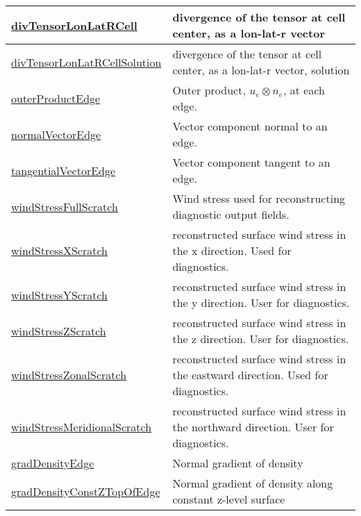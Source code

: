 {\begin{center}
\begin{longtable}{| p{2.0in} | p{4.0in} |}
    \hline
    \hyperref[subsec:var_sec_scratch_divTensorLonLatRCell]{divTensorLonLatRCell} & divergence of the tensor at cell center, as a lon-lat-r vector \\
    \hline
    \hyperref[subsec:var_sec_scratch_divTensorLonLatRCellSolution]{divTensorLonLatRCellSolution} & divergence of the tensor at cell center, as a lon-lat-r vector, solution \\
    \hline
    \hyperref[subsec:var_sec_scratch_outerProductEdge]{outerProductEdge} & Outer product, $u_e \otimes n_e$, at each edge. \\
    \hline
    \hyperref[subsec:var_sec_scratch_normalVectorEdge]{normalVectorEdge} & Vector component normal to an edge. \\
    \hline
    \hyperref[subsec:var_sec_scratch_tangentialVectorEdge]{tangentialVectorEdge} & Vector component tangent to an edge. \\
    \hline
    \hyperref[subsec:var_sec_scratch_windStressFullScratch]{windStressFullScratch} & Wind stress used for reconstructing diagnostic output fields. \\
    \hline
    \hyperref[subsec:var_sec_scratch_windStressXScratch]{windStressXScratch} & reconstructed surface wind stress in the x direction. Used for diagnostics. \\
    \hline
    \hyperref[subsec:var_sec_scratch_windStressYScratch]{windStressYScratch} & reconstructed surface wind stress in the y direction. User for diagnostics. \\
    \hline
    \hyperref[subsec:var_sec_scratch_windStressZScratch]{windStressZScratch} & reconstructed surface wind stress in the z direction. User for diagnostics. \\
    \hline
    \hyperref[subsec:var_sec_scratch_windStressZonalScratch]{windStressZonalScratch} & reconstructed surface wind stress in the eastward direction. Used for diagnostics. \\
    \hline
    \hyperref[subsec:var_sec_scratch_windStressMeridionalScratch]{windStressMeridionalScratch} & reconstructed surface wind stress in the northward direction. User for diagnostics. \\
    \hline
    \hyperref[subsec:var_sec_scratch_gradDensityEdge]{gradDensityEdge} & Normal gradient of density \\
    \hline
    \hyperref[subsec:var_sec_scratch_gradDensityConstZTopOfEdge]{gradDensityConstZTopOfEdge} & Normal gradient of density along constant z-level surface \\
    \hline

\end{longtable}
\end{center}}
